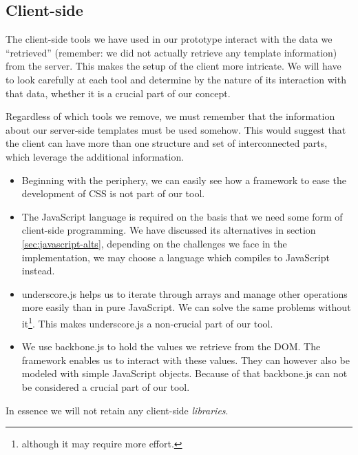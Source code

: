 \documentclass[thesis.tex]{subfiles}
\begin{document}
\subsection{Client-side}
The client-side tools we have used in our prototype interact with the data we
``retrieved'' (remember: we did not actually retrieve any template information)
from the server. This makes the setup of the client more intricate. We will have
to look carefully at each tool and determine by the nature of its interaction
with that data, whether it is a crucial part of our concept.

Regardless of which tools we remove, we must remember that the information about
our server-side templates must be used somehow. This would suggest that the
client can have more than one structure and set of interconnected parts, which
leverage the additional information.

\begin{itemize}
\item Beginning with the periphery, we can easily see how a framework to ease
	the development of CSS is not part of our tool.
\item The JavaScript language is required on the basis that we need some form of
	client-side programming. We have discussed its alternatives in
	section \ref{sec:javascript-alts}, depending on the challenges we face in the
	implementation, we may choose a language which compiles to JavaScript instead.
\item underscore.js helps us to iterate through arrays and manage other
	operations more easily than in pure JavaScript. We can solve the same problems
	without it\footnote{although it may require more effort.}.
	This makes underscore.js a non-crucial part of our tool.
\item We use backbone.js to hold the values we retrieve from the DOM. The
	framework enables us to interact with these values. They can however also be
	modeled with simple JavaScript objects. Because of that backbone.js can not be
	considered a crucial part of our tool.
\end{itemize}

In essence we will not retain any client-side \emph{libraries}.
\end{document}

